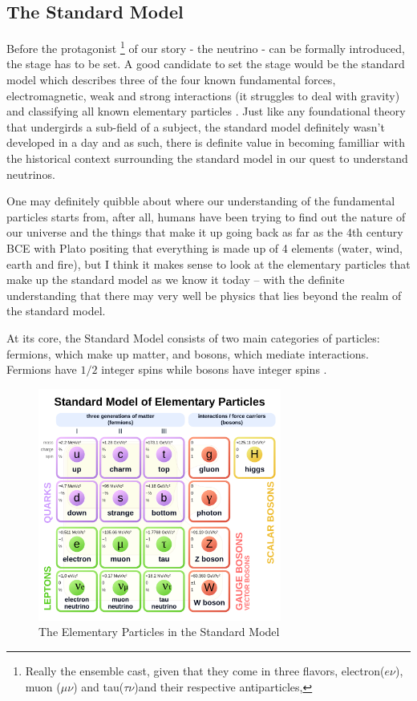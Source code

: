 \subsection{The Standard Model}

Before the protagonist
\footnote{Really the ensemble cast, given that they come in three flavors, electron($e\nu$), muon ($\mu \nu$) and tau($\tau \nu$)and their respective antiparticles,}
of our story - the neutrino - can be formally introduced, the stage has to be set.
A good candidate to set the stage would be the standard model which describes three of the four known fundamental forces, electromagnetic, weak and strong interactions (it struggles to deal with  gravity) and classifying all known elementary particles \cite{Oerter}.
Just like any foundational theory that undergirds a sub-field of a subject, the standard model definitely wasn't developed in a day and as such, there is definite value in becoming familliar with the historical context surrounding the standard model in our quest to understand neutrinos.

One may definitely quibble about where our understanding of the fundamental particles starts from, after all, humans have been trying to find out the nature of our universe and the things that make it up going back as far as the 4th century BCE with Plato positing that everything is made up of 4 elements (water, wind, earth and fire)\cite{Timaeus}, but I think it makes sense to look at the elementary particles that make up the standard model as we know it today -- with the definite understanding that there may very well be physics that lies beyond the realm of the standard model.

At its core, the Standard Model consists of two main categories of particles: fermions, which make up matter, and bosons, which mediate interactions.
Fermions have $1/2$ integer spins while bosons have integer spins \cite{Oerter}.

\begin{figure}[H]
  \centering
  \includegraphics[width=80mm]{figures/sm.png}
  \caption{The Elementary Particles in the Standard Model \cite{standard_model}}
  \label{sm}
\end{figure}


